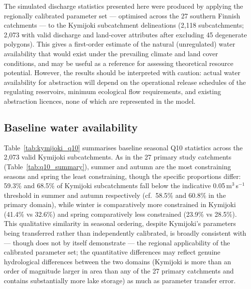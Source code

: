 \documentclass[draft]{agujournal2019}
\begin{document}
The simulated discharge statistics presented here were produced by applying the regionally calibrated parameter set --- optimised across the 27 southern Finnish catchments --- to the Kymijoki subcatchment delineations (2,118 subcatchments; 2,073 with valid discharge and land-cover attributes after excluding 45 degenerate polygons). This gives a first-order estimate of the natural (unregulated) water availability that would exist under the prevailing climate and land cover conditions, and may be useful as a reference for assessing theoretical resource potential. However, the results should be interpreted with caution: actual water availability for abstraction will depend on the operational release schedules of the regulating reservoirs, minimum ecological flow requirements, and existing abstraction licences, none of which are represented in the model.

\subsection{Baseline water availability}

Table~\ref{tab:kymijoki_q10} summarises baseline seasonal Q10 statistics across the 2,073 valid Kymijoki subcatchments. As in the 27 primary study catchments (Table~\ref{tab:q10_summary}), summer and autumn are the most constraining seasons and spring the least constraining, though the specific proportions differ: 59.3\% and 68.5\% of Kymijoki subcatchments fall below the indicative 0.05\,m$^3$\,s$^{-1}$ threshold in summer and autumn respectively (cf.\ 58.5\% and 60.8\% in the primary domain), while winter is comparatively more constrained in Kymijoki (41.4\% vs 32.6\%) and spring comparatively less constrained (23.9\% vs 28.5\%). This qualitative similarity in seasonal ordering, despite Kymijoki's parameters being transferred rather than independently calibrated, is broadly consistent with --- though does not by itself demonstrate --- the regional applicability of the calibrated parameter set; the quantitative differences may reflect genuine hydrological differences between the two domains (Kymijoki is more than an order of magnitude larger in area than any of the 27 primary catchments and contains substantially more lake storage) as much as parameter transfer error.
\end{document}
